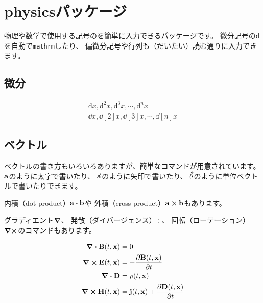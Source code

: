 \section{physicsパッケージ}

物理や数学で使用する記号のを簡単に入力できるパッケージです。
微分記号の\texttt{d}を自動で\texttt{mathrm}したり、
偏微分記号や行列も（だいたい）読む通りに入力できます。

\subsection{微分}

\begin{align}
    \mathrm{d}x, \mathrm{d}^{2}x, \mathrm{d}^{3}x, \cdots, \mathrm{d}^{n}x\\
    \dd{x}, \dd[2]{x}, \dd[3]{x}, \cdots, \dd[n]{x}
\end{align}

\subsection{ベクトル}

ベクトルの書き方もいろいろありますが、簡単なコマンドが用意されています。
$\vb{a}$のように太字で書いたり、
$\va{a}$のように矢印で書いたり、
$\vu{\theta}$のように単位ベクトルで書いたりできます。

内積（dot product）$\vb{a} \dotproduct \vb{b}$や
外積（cross product）$\vb{a} \crossproduct \vb{b}$もあります。

グラディエント$\grad$、
発散（ダイバージェンス）$\div$、
回転（ローテーション）$\curl$のコマンドもあります。

\begin{align}
    \div \vb{B}(t,\vb{x}) & = 0\\
    \curl \vb{E}(t,\vb{x}) & = - \pdv{\vb{B}(t,\vb{x})}{t}\\
    \div \vb{D} & = \rho(t,\vb{x})\\
    \curl \vb{H}(t,\vb{x}) & = \vb{j}(t,\vb{x}) + \pdv{\vb{D}(t,\vb{x})}{t}
\end{align}
